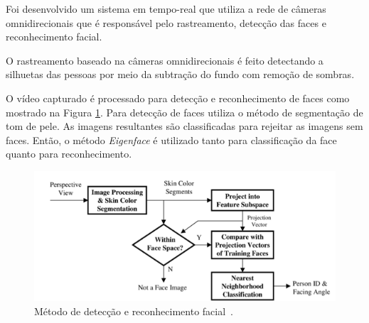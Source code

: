 Foi desenvolvido um sistema em tempo-real que utiliza a rede de câmeras omnidirecionais que é responsável pelo rastreamento, detecção das faces e reconhecimento facial. 

O rastreamento baseado na câmeras omnidirecionais é feito detectando a silhuetas das pessoas por meio da subtração do fundo com remoção de sombras.

O vídeo capturado é processado para detecção e reconhecimento de faces como mostrado na Figura \ref{facerec}. Para detecção de faces utiliza o método de segmentação de tom de pele. As imagens resultantes são classificadas para rejeitar as imagens sem faces. Então, o método \textit{Eigenface} é utilizado tanto para classificação da face quanto para reconhecimento. 

	\begin{figure}[hbt]
		\begin{center}
			\includegraphics[scale=0.8]{figuras/3.TrabalhosCorrelatos/facerec.png}
		\end{center}
		\caption{Método de detecção e reconhecimento facial~\cite{trivedi}.}
		\label{facerec}
	\end{figure}